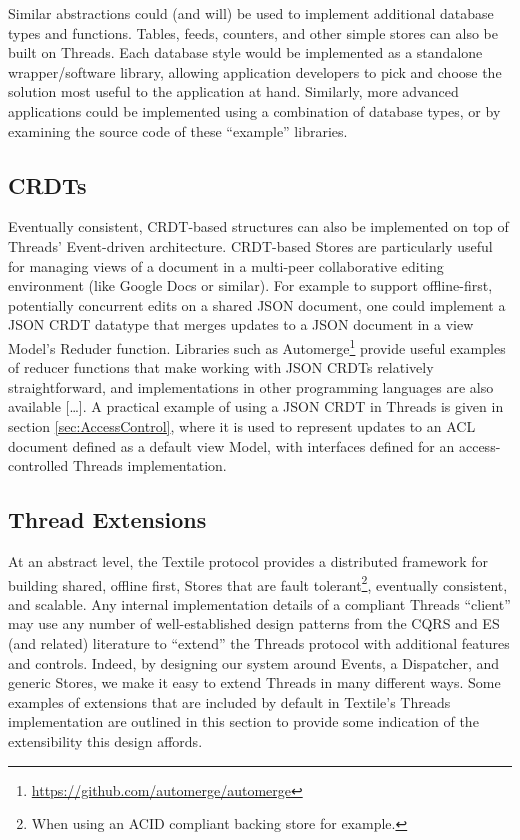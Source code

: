 \documentclass{textile}
\begin{document}
Similar abstractions could (and will) be used to implement additional database types and functions. Tables, feeds, counters, and other simple stores can also be built on Threads. Each database style would be implemented as a standalone wrapper/software library, allowing application developers to pick and choose the solution most useful to the application at hand. Similarly, more advanced applications could be implemented using a combination of database types, or by examining the source code of these ``example'' libraries.

\subsection{CRDTs} \label{sec:TexCRDT}

Eventually consistent, CRDT-based structures can also be implemented on top of Threads' Event-driven architecture. CRDT-based Stores are particularly useful for managing views of a document in a multi-peer collaborative editing environment (like Google Docs or similar). For example to support offline-first, potentially concurrent edits on a shared JSON document, one could implement a JSON CRDT datatype \cite{kleppmannConflictFreeReplicatedJSON2017} that merges updates to a JSON document in a view Model's Reduder function. Libraries such as Automerge\footnote{\url{https://github.com/automerge/automerge}} provide useful examples of reducer functions that make working with JSON CRDTs relatively straightforward, and implementations in other programming languages are also available [\dots]. A practical example of using a JSON CRDT in Threads is given in section \ref{sec:AccessControl}, where it is used to represent updates to an ACL document defined as a default view Model, with interfaces defined for an access-controlled Threads implementation.

\subsection{Thread Extensions}

At an abstract level, the Textile protocol provides a distributed framework for building shared, offline first, Stores that are fault tolerant\footnote{When using an ACID compliant backing store for example.}, eventually consistent, and scalable. Any internal implementation details of a compliant Threads ``client'' may use any number of well-established design patterns from the CQRS and ES (and related) literature to ``extend'' the Threads protocol with additional features and controls. Indeed, by designing our system around Events, a Dispatcher, and generic Stores, we make it easy to extend Threads in many different ways. Some examples of extensions that are included by default in Textile's Threads implementation are outlined in this section to provide some indication of the extensibility this design affords.
\end{document}
